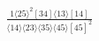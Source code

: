 \documentclass[varwidth, border=5pt]{standalone}
\begin{document}
\begin{my}
$\begin{gathered}
\scriptscriptstyle\frac{1⟨25⟩^2[34]⟨13⟩[14]}{⟨14⟩⟨23⟩⟨35⟩⟨45⟩[45]^2}
\end{gathered}$
\end{my}
\end{document}
